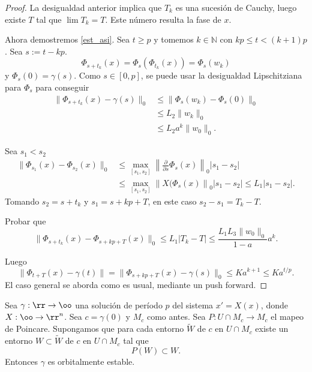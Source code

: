\begin{proof}
La desigualdad anterior implica que $T_k$ es una sucesión de Cauchy, luego existe $T$ tal que $\lim T_k=T$. Este número resulta la fase de $x$. 

Ahora demostremos  \eqref{est_asi}. Sea $t\geq p$ y tomemos $k\in\mathbb{N}$ con $kp\leq t<(k+1)p$. Sea $s:=t-kp$. 
\[\Phi_{s+t_k}(x)=\Phi_{s}\left(\Phi_{t_k}(x)\right)=\Phi_{s}(w_k)\]
y $\Phi_s(0)=\gamma(s)$. Como $s\in [0,p]$, se puede usar la desigualdad Lipschitziana para $\Phi_s$ para conseguir
\[\begin{split}
  \|\Phi_{s+t_k}(x)-\gamma(s)\|_0 &\leq \|\Phi_s(w_k)-\Phi_s(0)\|_0\\&\leq L_2\|w_k\|_0\\&\leq L_2a^k\|w_0\|_0. 
  \end{split}
\]





Sea $s_1<s_2$  
\[\begin{split}
   \|\Phi_{s_1}(x)-\Phi_{s_2}(x)\|_0 &\leq \max_{[s_1,s_2]} \left\|\frac{\partial}{\partial s} \Phi_s(x) \right\|_0|s_1-s_2|\\
 &\leq \max_{[s_1,s_2]} \left\| X(\Phi_s(x) \right\|_0|s_1-s_2|\leq L_1 |s_1-s_2|.
  \end{split}
\]
Tomando $s_2=s+t_k$ y $s_1=s+kp+T$, en este caso $s_2-s_1=T_k-T$.

\begin{ejercicio} Probar que
\[ 
   \|\Phi_{s+t_k}(x)-\Phi_{s+kp+T}(x)\|_0 \leq L_1 |T_k-T|\leq \frac{L_1L_3\|w_0\|_0}{1-a}a^k.
 \]
 \end{ejercicio}
Luego
\[ \|\Phi_{t+T}(x)-\gamma(t)\|=\|\Phi_{s+kp+T}(x)-\gamma(s)\|_0\leq Ka^{k+1}\leq Ka^{t/p}.   \]
El caso general se aborda como es usual, mediante un push forward.
\end{proof}




\begin{corolario}
  Sea $\gamma:\rr\to\oo$ una solución de período $p$ del sistema $x'=X(x)$, donde $X:\oo\to \rr^n$. Sea $c=\gamma(0)$ y $M_c$ como antes. 
Sea $P:U\cap M_c\to M_c$ el mapeo de Poincare. Supongamos que para cada entorno $\tilde{W}$ de $c$  en $U\cap M_c$ existe un entorno $W\subset\tilde{W}$
de $c$  en $U\cap M_c$ tal que
\[P(W)\subset W.\]
Entonces $\gamma$ es orbitalmente estable. 
\end{corolario}







